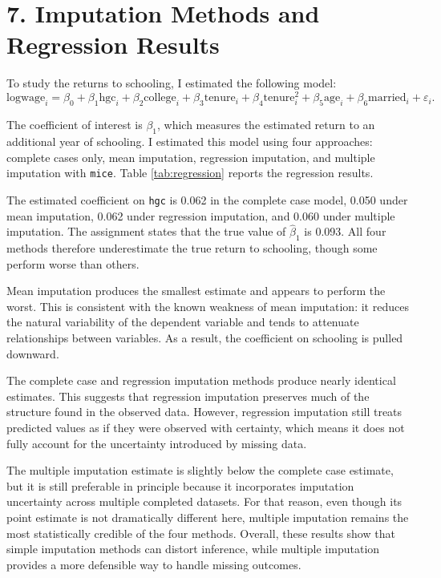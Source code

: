 \documentclass[12pt]{article}
\begin{document}
\section*{7. Imputation Methods and Regression Results}
To study the returns to schooling, I estimated the following model:
\[
\text{logwage}_i = \beta_0 + \beta_1 \text{hgc}_i + \beta_2 \text{college}_i + \beta_3 \text{tenure}_i + \beta_4 \text{tenure}_i^2 + \beta_5 \text{age}_i + \beta_6 \text{married}_i + \varepsilon_i.
\]

The coefficient of interest is $\beta_1$, which measures the estimated return to an additional year of schooling. I estimated this model using four approaches: complete cases only, mean imputation, regression imputation, and multiple imputation with \texttt{mice}. Table \ref{tab:regression} reports the regression results.

\begin{table}[H]
\centering
\caption{Returns to Schooling Across Imputation Methods}
\label{tab:regression}

\end{table}

The estimated coefficient on \texttt{hgc} is 0.062 in the complete case model, 0.050 under mean imputation, 0.062 under regression imputation, and 0.060 under multiple imputation. The assignment states that the true value of $\hat{\beta}_1$ is 0.093. All four methods therefore underestimate the true return to schooling, though some perform worse than others.

Mean imputation produces the smallest estimate and appears to perform the worst. This is consistent with the known weakness of mean imputation: it reduces the natural variability of the dependent variable and tends to attenuate relationships between variables. As a result, the coefficient on schooling is pulled downward.

The complete case and regression imputation methods produce nearly identical estimates. This suggests that regression imputation preserves much of the structure found in the observed data. However, regression imputation still treats predicted values as if they were observed with certainty, which means it does not fully account for the uncertainty introduced by missing data.

The multiple imputation estimate is slightly below the complete case estimate, but it is still preferable in principle because it incorporates imputation uncertainty across multiple completed datasets. For that reason, even though its point estimate is not dramatically different here, multiple imputation remains the most statistically credible of the four methods. Overall, these results show that simple imputation methods can distort inference, while multiple imputation provides a more defensible way to handle missing outcomes.
\end{document}
